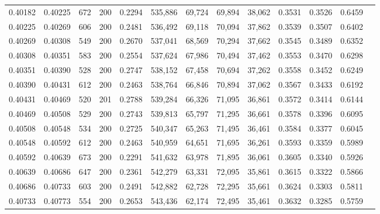 \begin{tabular}{rrrrrrrrrrrrr}
0.40182 & 0.40225 &   672 & 200 &                                     0.2294 & 535,886 &  69,724 &  69,894 &  38,062 & 0.3531 & 0.3526 & 0.6459 \\
0.40225 & 0.40269 &   606 & 200 &                                     0.2481 & 536,492 &  69,118 &  70,094 &  37,862 & 0.3539 & 0.3507 & 0.6402 \\
0.40269 & 0.40308 &   549 & 200 &                                     0.2670 & 537,041 &  68,569 &  70,294 &  37,662 & 0.3545 & 0.3489 & 0.6352 \\
0.40308 & 0.40351 &   583 & 200 &                                     0.2554 & 537,624 &  67,986 &  70,494 &  37,462 & 0.3553 & 0.3470 & 0.6298 \\
0.40351 & 0.40390 &   528 & 200 &                                     0.2747 & 538,152 &  67,458 &  70,694 &  37,262 & 0.3558 & 0.3452 & 0.6249 \\
0.40390 & 0.40431 &   612 & 200 &                                     0.2463 & 538,764 &  66,846 &  70,894 &  37,062 & 0.3567 & 0.3433 & 0.6192 \\
0.40431 & 0.40469 &   520 & 201 &                                     0.2788 & 539,284 &  66,326 &  71,095 &  36,861 & 0.3572 & 0.3414 & 0.6144 \\
0.40469 & 0.40508 &   529 & 200 &                                     0.2743 & 539,813 &  65,797 &  71,295 &  36,661 & 0.3578 & 0.3396 & 0.6095 \\
0.40508 & 0.40548 &   534 & 200 &                                     0.2725 & 540,347 &  65,263 &  71,495 &  36,461 & 0.3584 & 0.3377 & 0.6045 \\
0.40548 & 0.40592 &   612 & 200 &                                     0.2463 & 540,959 &  64,651 &  71,695 &  36,261 & 0.3593 & 0.3359 & 0.5989 \\
0.40592 & 0.40639 &   673 & 200 &                                     0.2291 & 541,632 &  63,978 &  71,895 &  36,061 & 0.3605 & 0.3340 & 0.5926 \\
0.40639 & 0.40686 &   647 & 200 &                                     0.2361 & 542,279 &  63,331 &  72,095 &  35,861 & 0.3615 & 0.3322 & 0.5866 \\
0.40686 & 0.40733 &   603 & 200 &                                     0.2491 & 542,882 &  62,728 &  72,295 &  35,661 & 0.3624 & 0.3303 & 0.5811 \\
0.40733 & 0.40773 &   554 & 200 &                                     0.2653 & 543,436 &  62,174 &  72,495 &  35,461 & 0.3632 & 0.3285 & 0.5759 \\

\end{tabular}
